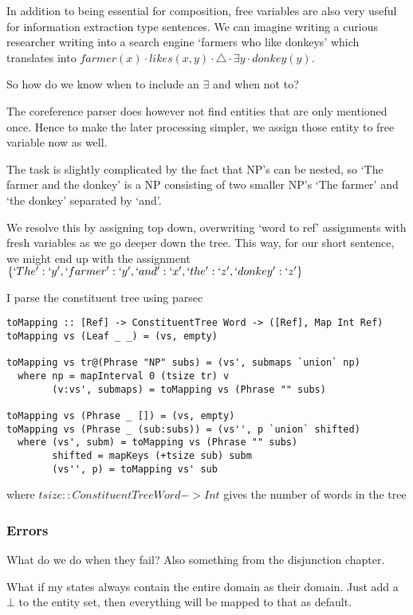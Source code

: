 \documentclass[12pt]{article}
\begin{document}
In addition to being essential for composition, free variables are also very useful for information extraction type sentences. We can imagine writing a curious researcher writing into a search engine `farmers who like donkeys' which translates into $farmer(x) \cdot likes(x,y) \cdot \triangle \cdot \exists y \cdot donkey(y)$.

So how do we know when to include an $\exists$ and when not to?

The coreference parser does however not find entities that are only mentioned once. Hence to make the later processing simpler, we assign those entity to free variable now as well.

The task is slightly complicated by the fact that NP's can be nested, so `The farmer and the donkey' is a NP consisting of two smaller NP's `The farmer' and `the donkey' separated by `and'.

We resolve this by assigning top down, overwriting `word to ref' assignments with fresh variables as we go deeper down the tree. This way, for our short sentence, we might end up with the assignment $\{`The': `y', `farmer': `y', `and': `x', `the': `z', `donkey': `z'\}$

I parse the constituent tree using parsec\cite{leijen2001parsec}

\begin{lstlisting}
toMapping :: [Ref] -> ConstituentTree Word -> ([Ref], Map Int Ref)
toMapping vs (Leaf _ _) = (vs, empty)

toMapping vs tr@(Phrase "NP" subs) = (vs', submaps `union` np)
  where np = mapInterval 0 (tsize tr) v
        (v:vs', submaps) = toMapping vs (Phrase "" subs)

toMapping vs (Phrase _ []) = (vs, empty)
toMapping vs (Phrase _ (sub:subs)) = (vs'', p `union` shifted)
  where (vs', subm) = toMapping vs (Phrase "" subs)
        shifted = mapKeys (+tsize sub) subm
        (vs'', p) = toMapping vs' sub
\end{lstlisting}

where $tsize :: ConstituentTree Word -> Int$ gives the number of words in the tree


\subsubsection{Errors}

What do we do when they fail?
Also something from the disjunction chapter.

What if my states always contain the entire domain as their domain. Just add a $\bot$ to the entity set, then everything will be mapped to that as default.
\end{document}
